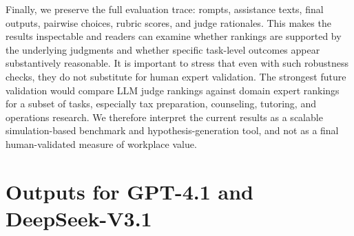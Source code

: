 Finally, we preserve the full evaluation trace: rompts, assistance texts, final outputs, pairwise choices, rubric scores, and judge rationales. This makes the results inspectable and readers can examine whether rankings are supported by the underlying judgments and whether specific task-level outcomes appear substantively reasonable. It is important to stress that even with such robustness checks, they do not substitute for human expert validation. The strongest future validation would compare LLM judge rankings against domain expert rankings for a subset of tasks, especially tax preparation, counseling, tutoring, and operations research. We therefore interpret the current results as a scalable simulation-based benchmark and hypothesis-generation tool, and not as a final human-validated measure of workplace value.


\section{Outputs for GPT-4.1 and DeepSeek-V3.1}
\label{app:eval-examples}

\FloatBarrier

\FloatBarrier
